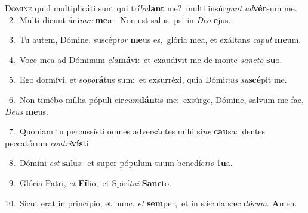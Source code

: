 \lettrine{\initial\textcolor{\initialcolor}{D}}{ómine} quid multiplicáti sunt qui trí\-\textit{bu}\-\textbf{lant} me?~\star multi insúr\textit{gunt} \textit{ad}\-\textbf{vér}sum me.\\
{\numbfont\textcolor{\numbcolor}{~2.}}~Multi dicunt áni\textit{mæ} \textbf{me}\-æ:~\star Non est salus ipsi in \textit{De}\-\textit{o} \textbf{e}\-jus.\par
{\numbfont\textcolor{\numbcolor}{~3.}}~Tu autem, Dómine, suscép\textit{tor} \textbf{me}\-us es,~\star glória mea, et exáltans \textit{ca}\-\textit{put} \textbf{me}\-um.\par
{\numbfont\textcolor{\numbcolor}{~4.}}~Voce mea ad Dóminum \textit{cla}\-\textbf{má}vi:~\star et exaudívit me de monte \textit{sanc}\-\textit{to} \textbf{su}\-o.\par
{\numbfont\textcolor{\numbcolor}{~5.}}~Ego dormívi, et so\-\textit{po}\-\textbf{rá}tus sum:~\star et exsurréxi, quia Dómi\textit{nus} \textit{su}\-\textbf{scé}pit me.\par
{\numbfont\textcolor{\numbcolor}{~6.}}~Non timébo míllia pópuli cir\-\textit{cum}\-\textbf{dán}tis me:~\star exsúrge, Dómine, salvum me fac, \textit{De}\-\textit{us} \textbf{me}\-us.\par
{\numbfont\textcolor{\numbcolor}{~7.}}~Quóniam tu percussísti omnes adversántes mihi si\textit{ne} \textbf{cau}\-sa:~\star dentes peccatórum \textit{con}\-\textit{tri}\textbf{vís}ti.\par
{\numbfont\textcolor{\numbcolor}{~8.}}~Dómini \textit{est} \textbf{sa}\-lus:~\star et super pópulum tuum benedíc\-\textit{ti}\-\textit{o} \textbf{tu}\-a.\par
{\numbfont\textcolor{\numbcolor}{~9.}}~Glória Patri, \textit{et} \textbf{Fí}\-lio,~\star et Spirí\-\textit{tu}\-\textit{i} \textbf{Sanc}\-to.\par
{\numbfont\textcolor{\numbcolor}{10.}}~Sicut erat in princípio, et nunc, \textit{et} \textbf{sem}\-per,~\star et in sǽcula sæcu\-\textit{ló}\-\textit{rum}. \textbf{A}\-men.\par
